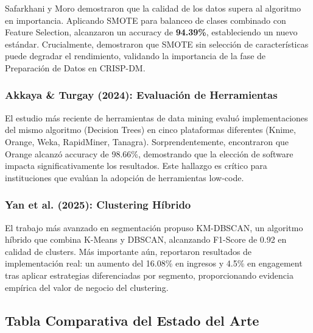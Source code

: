 \documentclass[12pt,letterpaper]{article}
\begin{document}
Safarkhani y Moro \cite{safarkhani2021} demostraron que la calidad de los datos supera al algoritmo en importancia. Aplicando SMOTE para balanceo de clases combinado con Feature Selection, alcanzaron un accuracy de \textbf{94.39\%}, estableciendo un nuevo estándar. Crucialmente, demostraron que SMOTE sin selección de características puede degradar el rendimiento, validando la importancia de la fase de Preparación de Datos en CRISP-DM.

\subsubsection{Akkaya \& Turgay (2024): Evaluación de Herramientas}

El estudio más reciente de herramientas de data mining \cite{akkaya2024} evaluó implementaciones del mismo algoritmo (Decision Trees) en cinco plataformas diferentes (Knime, Orange, Weka, RapidMiner, Tanagra). Sorprendentemente, encontraron que Orange alcanzó accuracy de 98.66\%, demostrando que la elección de software impacta significativamente los resultados. Este hallazgo es crítico para instituciones que evalúan la adopción de herramientas low-code.

\subsubsection{Yan et al. (2025): Clustering Híbrido}

El trabajo más avanzado en segmentación \cite{yan2025} propuso KM-DBSCAN, un algoritmo híbrido que combina K-Means y DBSCAN, alcanzando F1-Score de 0.92 en calidad de clusters. Más importante aún, reportaron resultados de implementación real: un aumento del 16.08\% en ingresos y 4.5\% en engagement tras aplicar estrategias diferenciadas por segmento, proporcionando evidencia empírica del valor de negocio del clustering.

\subsection{Tabla Comparativa del Estado del Arte}
\end{document}
